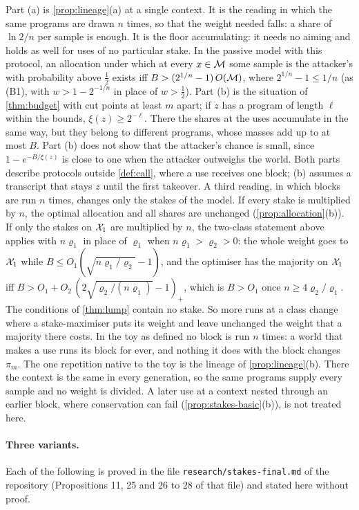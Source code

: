 Part (a) is \cref{prop:lineage}(a) at a single context. It is the reading in which the same programs are drawn
$n$ times, so that the weight needed falls: a share of $\ln2/n$ per sample is enough. It is the floor
accumulating: it needs no aiming and holds as well for uses of no particular stake. In the passive model with
this protocol, an allocation under which at every $x\in\mathcal M$ some sample is the attacker's with probability
above $\frac12$ exists iff $B>(2^{1/n}-1)\,O(\mathcal M)$, where $2^{1/n}-1\le1/n$ (as (B1), with $w>1-2^{-1/n}$ in
place of $w>\frac12$). Part (b) is the situation of \cref{thm:budget} with cut points at least $m$ apart; if
$z$ has a program of length $\ell$ within the bounds, $\xi(z)\ge2^{-\ell}$. There the shares at the uses
accumulate in the same way, but they belong to different programs, whose masses add up to at most $B$. Part
(b) does not show that the attacker's chance is small, since $1-e^{-B/\xi(z)}$ is close to one when the
attacker outweighs the world. Both parts describe protocols outside \cref{def:call}, where a use receives one
block; (b) assumes a transcript that stays $z$ until the first takeover. A third reading, in which blocks are
run $n$ times, changes only the stakes of the model. If every stake is multiplied by $n$, the optimal
allocation and all shares are unchanged (\cref{prop:allocation}(b)). If only the stakes on $\mathcal X_1$ are
multiplied by $n$, the two-class statement above applies with $n\varrho_1$ in place of $\varrho_1$ when
$n\varrho_1>\varrho_2>0$: the whole weight goes to $\mathcal X_1$ while $B\le O_1(\sqrt{n\varrho_1/\varrho_2}-1)$,
and the optimiser has the majority on $\mathcal X_1$ iff $B>O_1+O_2\,(2\sqrt{\varrho_2/(n\varrho_1)}-1)_+$, which is
$B>O_1$ once $n\ge4\varrho_2/\varrho_1$. The conditions of \cref{thm:lump} contain no stake. So more runs at a
class change where a stake-maximiser puts its weight and leave unchanged the weight that a majority there
costs. In the toy as defined no block is run $n$ times: a world that makes a use runs its block for ever, and
nothing it does with the block changes $\pi_m$. The one repetition native to the toy is the lineage of
\cref{prop:lineage}(b). There the context is the same in every generation, so the same programs supply every
sample and no weight is divided. A later use at a context nested through an earlier block, where conservation
can fail (\cref{prop:stakes-basic}(b)), is not treated here.

\paragraph{Three variants.} Each of the following is proved in the file \texttt{research/stakes-final.md} of
the repository (Propositions 11, 25 and 26 to 28 of that file) and stated here without proof.

